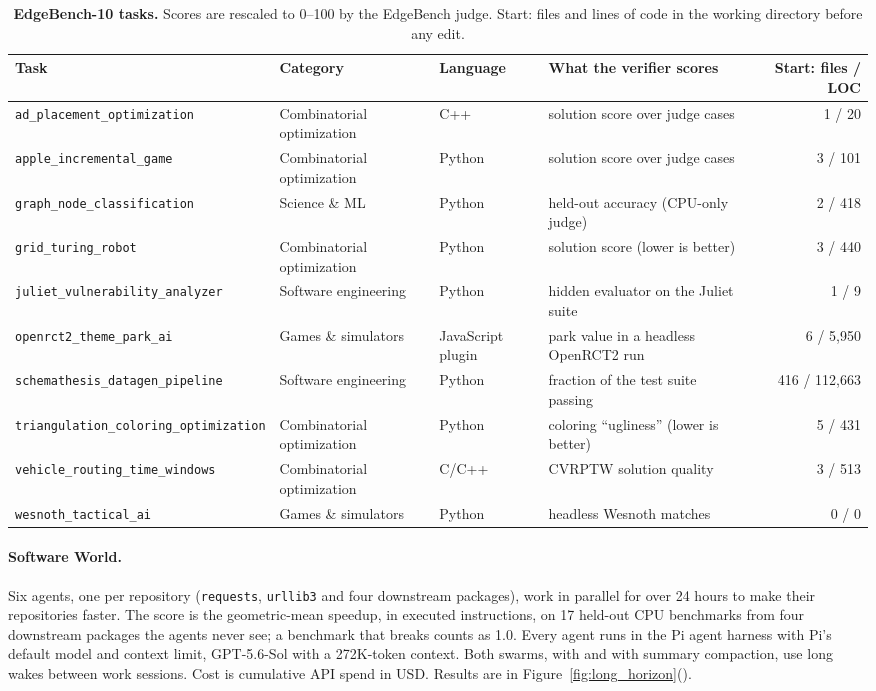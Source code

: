 \begin{table}[h]
\centering
\scriptsize
\setlength{\tabcolsep}{4pt}
\begin{tabular}{@{}lll>{\raggedright\arraybackslash}p{4.2cm}r@{}}
\toprule
\textbf{Task} & \textbf{Category} & \textbf{Language} & \textbf{What the verifier scores} & \textbf{Start: files / LOC} \\
\midrule
\texttt{ad\_placement\_optimization} & Combinatorial optimization & C++ & solution score over judge cases & 1 / 20 \\
\texttt{apple\_incremental\_game} & Combinatorial optimization & Python & solution score over judge cases & 3 / 101 \\
\texttt{graph\_node\_classification} & Science \& ML & Python & held-out accuracy (CPU-only judge) & 2 / 418 \\
\texttt{grid\_turing\_robot} & Combinatorial optimization & Python & solution score (lower is better) & 3 / 440 \\
\texttt{juliet\_vulnerability\_analyzer} & Software engineering & Python & hidden evaluator on the Juliet suite & 1 / 9 \\
\texttt{openrct2\_theme\_park\_ai} & Games \& simulators & JavaScript plugin & park value in a headless OpenRCT2 run & 6 / 5{,}950 \\
\texttt{schemathesis\_datagen\_pipeline} & Software engineering & Python & fraction of the test suite passing & 416 / 112{,}663 \\
\texttt{triangulation\_coloring\_optimization} & Combinatorial optimization & Python & coloring ``ugliness'' (lower is better) & 5 / 431 \\
\texttt{vehicle\_routing\_time\_windows} & Combinatorial optimization & C/C++ & CVRPTW solution quality & 3 / 513 \\
\texttt{wesnoth\_tactical\_ai} & Games \& simulators & Python & headless Wesnoth matches & 0 / 0 \\
\bottomrule
\end{tabular}
\caption{\textbf{EdgeBench-10 tasks.} Scores are rescaled to 0--100 by the EdgeBench judge. Start: files and lines of code in the working directory before any edit.}
\label{tab:edgebench10_tasks}
\end{table}

\paragraph{Software World.}\label{app:open_multi}
Six agents, one per repository (\texttt{requests}, \texttt{urllib3} and four downstream packages), work in parallel for over 24 hours to make their repositories faster. The score is the geometric-mean speedup, in executed instructions, on 17 held-out CPU benchmarks from four downstream packages the agents never see; a benchmark that breaks counts as 1.0. Every agent runs in the Pi agent harness with Pi's default model and context limit, GPT-5.6-Sol with a 272K-token context. Both swarms, with \ours{} and with summary compaction, use long wakes between work sessions. Cost is cumulative API spend in USD. Results are in Figure~\ref{fig:long_horizon}().

